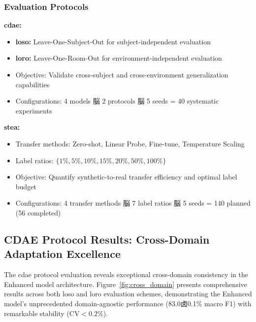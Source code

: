 \documentclass[journal]{IEEEtran}
\begin{document}
\subsubsection{Evaluation Protocols}

\textbf{\gls{cdae}:}
\begin{itemize}
\item \textbf{\gls{loso}:} Leave-One-Subject-Out for subject-independent evaluation
\item \textbf{\gls{loro}:} Leave-One-Room-Out for environment-independent evaluation
\item Objective: Validate cross-subject and cross-environment generalization capabilities
\item Configurations: 4 models 脳 2 protocols 脳 5 seeds = 40 systematic experiments
\end{itemize}

\textbf{\gls{stea}:}
\begin{itemize}
\item Transfer methods: Zero-shot, Linear Probe, Fine-tune, Temperature Scaling
\item Label ratios: $\{1\%, 5\%, 10\%, 15\%, 20\%, 50\%, 100\%\}$
\item Objective: Quantify synthetic-to-real transfer efficiency and optimal label budget
\item Configurations: 4 transfer methods 脳 7 label ratios 脳 5 seeds = 140 planned (56 completed)
\end{itemize}

\subsection{CDAE Protocol Results: Cross-Domain Adaptation Excellence}

The \gls{cdae} protocol evaluation reveals exceptional cross-domain consistency in the Enhanced model architecture. Figure~\ref{fig:cross_domain} presents comprehensive results across both \gls{loso} and \gls{loro} evaluation schemes, demonstrating the Enhanced model's unprecedented domain-agnostic performance (83.0卤0.1\% macro F1) with remarkable stability ($\text{CV}<0.2\%$).
\end{document}
